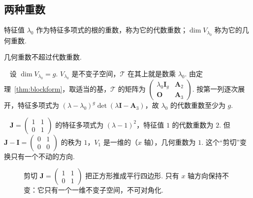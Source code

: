 \documentclass[lang=cn,10.5pt,scheme=chinese,toc=twocol,section,chinesefont=nofont,
twoside,citestyle=gb7714-2015,bibstyle=gb7714-2015]{elegantbook}
\DeclareRobustCommand{\textbf}[1]{{\lnsemiboldlatin\lnsemiboldcjk #1}}
\newcommand{\vv}[1]{\boldsymbol{#1}}
\numberwithin{equation}{section}   %
\newcommand*{\lnlabel}[1]{{\sffamily\bfseries\color{black}#1}}
\renewenvironment{example}[1][]{%
	\refstepcounter{exam}%
	\par\noindent\lnlabel{\examplename\ \theexam\ifblank{#1}{}{\ #1}}\ \rmfamily}{%
	\par\ignorespacesafterend}
\renewenvironment{proof}{%
	\par\noindent\lnlabel{\proofname}\;\ \color{black!90}\cfs}{\par}
\begin{document}
\subsection{两种重数}

\begin{definition}
  特征值 $\lambda_0$ 作为特征多项式的根的重数，称为它的\textbf{代数重数}；$\dim V_{\lambda_0}$ 称为它的\textbf{几何重数}.
\end{definition}

\begin{theorem}
  \label{thm:geoalg}
  几何重数不超过代数重数.
\end{theorem}
\begin{proof}
  设 $\dim V_{\lambda_0}=g$. $V_{\lambda_0}$ 是不变子空间，$\mathscr T$ 在其上就是数乘 $\lambda_0$. 由定理~\ref{thm:blockform}，取适当的基，$\mathscr T$ 的矩阵为 $
    \begin{pmatrix}
      \lambda_0\vv I_g & \vv A_2 \\ \vv O&\vv A_3
    \end{pmatrix}
  $. 按第一列逐次展开，特征多项式为 $(\lambda-\lambda_0)^g\det(\lambda\vv I-\vv A_3)$，故 $\lambda_0$ 的代数重数至少为 $g$.
\end{proof}

\begin{example}
  $\vv J=
    \begin{pmatrix}
      1 & 1 \\0&1
    \end{pmatrix}
  $ 的特征多项式为 $(\lambda-1)^2$，特征值 $1$ 的代数重数为 $2$. 但 $\vv J-\vv I=
    \begin{pmatrix}
      0 & 1 \\0&0
    \end{pmatrix}
  $ 的秩为 $1$，$V_1$ 是一维的（$x$ 轴），几何重数为 $1$. 这个“剪切”变换只有一个不动的方向.
\end{example}
\begin{figure}[htbp]
  \centering
  \caption{剪切 $\vv J=
      \begin{pmatrix}
        1 & 1 \\0&1
      \end{pmatrix}
    $ 把正方形推成平行四边形. 只有 $x$ 轴方向保持不变：它只有一个一维不变子空间，不可对角化.}
  \label{fig:shear}
\end{figure}
\end{document}
